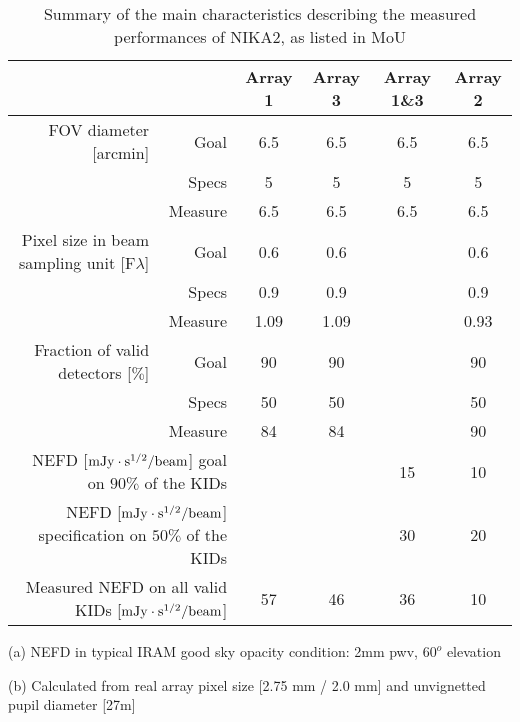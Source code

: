 \begin{table}[h]
  \caption[Main performance requirement]{Summary of the main characteristics describing the measured performances of NIKA2, as listed in MoU}
  \label{tab:nika2summary_main}
  \begin{threeparttable}
    \begin{tabular}{|r|r|c|c|c|c|}
      \hline
      \multicolumn{2}{|r|}{}           & Array 1 & Array 3  & Array 1\&3 & Array 2 \\
      \hline
      \hline
      FOV diameter [arcmin] & Goal     &  6.5 & 6.5  & 6.5 & 6.5   \\
                            & Specs    &   5  &   5  &   5 &   5   \\
                            & Measure  &  6.5 & 6.5  & 6.5 &  6.5  \\
      \hline
      Pixel size in beam sampling unit\tnote{b}\hspace{1mm} [F$\lambda$]  & Goal    & 0.6  &  0.6  &    &  0.6 \\
                                                     & Specs   & 0.9  &  0.9  &    &  0.9 \\
                                                     & Measure & 1.09 &  1.09 &    &  0.93 \\
      \hline
      Fraction of valid detectors [$\%$] & Goal     &   90      &    90    &      &     90  \\
                                         & Specs    &   50     &    50    &      &     50  \\
                                         & Measure  &   84     &    84    &      &     90  \\
      \hline
      \multicolumn{2}{|r|}{NEFD\tnote{a}\hspace{1mm} [$\rm{mJy} \cdot \rm{s}^{1/2}/\rm{beam}$] goal on $90\%$ of the KIDs} &  &  &  15  & 10 \\
      \multicolumn{2}{|r|}{NEFD\tnote{a}\hspace{1mm} [$\rm{mJy} \cdot \rm{s}^{1/2}/\rm{beam}$] specification on $50\%$ of the KIDs}  &       &     &  30  & 20 \\
      \multicolumn{2}{|r|}{Measured NEFD\tnote{a}\hspace{1mm} on all valid KIDs [$\rm{mJy} \cdot \rm{s}^{1/2}/\rm{beam}$]}           & 57  &  46   &  36  & 10 \\
      \hline\hline      
\end{tabular}
  \begin{tablenotes}
  \item[(a)] NEFD in typical IRAM good sky opacity condition: 2mm pwv, $60^o$ elevation
  \item[(b)] Calculated from real array pixel size [2.75 mm / 2.0 mm] and unvignetted pupil diameter [27m]
    \end{tablenotes}
\end{threeparttable}
\end{table} 



